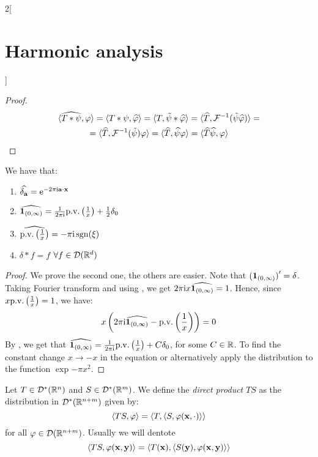 \documentclass[../../../main_math.tex]{subfiles}
\begin{document}
\begin{multicols}{2}[\section{Harmonic analysis}]
\begin{proof}
    \begin{multline*}
      \langle \widehat{T*\psi},\varphi\rangle=\langle T*\psi,\widehat{\varphi}\rangle=\langle T,\tilde\psi*\widehat{\varphi}\rangle=\langle \widehat{T},\mathcal{F}^{-1}(\tilde{\psi}\widehat{\varphi})\rangle=\\
      =\langle \widehat{T},\mathcal{F}^{-1}(\tilde{\psi})\varphi\rangle=\langle \widehat{T},\widehat{\psi}\varphi\rangle=\langle \widehat{T}\widehat{\psi},\varphi\rangle
    \end{multline*}
  \end{proof}
  \begin{lemma}\label{HA:lemma_propdelta}
    We have that:
    \begin{enumerate}
      \item $\widehat{\delta_{\boldsymbol{\mathrm{a}}}}=\mathrm{e}^{-2\pi\mathrm{i} \boldsymbol{\mathrm{a}}\cdot\boldsymbol{\mathrm{x}}}$
      \item $\widehat{\boldsymbol{\mathrm{1}}_{(0,\infty)}}=\frac{1}{2\pi\mathrm{i}}\mathrm{p.v.}\left(\frac{1}{x}\right)+\frac{1}{2}\delta_0$
      \item $\widehat{\mathrm{p.v.}\left(\frac{1}{x}\right)}=-\pi \mathrm{i} \operatorname{sgn}(\xi)$
      \item $\delta*f=f$ $\forall f\in \mathcal{D}(\mathbb{R}^d)$
    \end{enumerate}
  \end{lemma}
  \begin{proof}
    We prove the second one, the others are easier. Note that ${(\boldsymbol{\mathrm{1}}_{(0,\infty)})}'=\delta$. Taking Fourier transform and using , we get
    $ 2\pi\mathrm{i} x \widehat{\boldsymbol{\mathrm{1}}_{(0,\infty)}}=1$. Hence, since $x\mathrm{p.v.}\left(\frac{1}{x}\right)=1$, we have:
    $$
      x\left(2\pi\mathrm{i} \widehat{\boldsymbol{\mathrm{1}}_{(0,\infty)}}-\mathrm{p.v.}\left(\frac{1}{x}\right)\right)=0
    $$
    By , we get that $\widehat{\boldsymbol{\mathrm{1}}_{(0,\infty)}}=\frac{1}{2\pi\mathrm{i}}\mathrm{p.v.}\left(\frac{1}{x}\right)+C\delta_0$, for some $C\in \mathbb{R}$. To find the constant change $x\to -x$ in the equation or alternatively apply the distribution to the function $\exp{-\pi x^2}$.
  \end{proof}
  \begin{definition}
    Let $T\in \mathcal{D}^*(\mathbb{R}^n)$ and $S\in \mathcal{D}^*(\mathbb{R}^m)$. We define the \emph{direct product} $TS$ as the distribution in $\mathcal{D}^*(\mathbb{R}^{n+m})$ given by:
    $$
      \langle TS,\varphi\rangle=\langle T,\langle S ,\varphi(\boldsymbol{\mathrm{x}},\cdot)\rangle\rangle
    $$
    for all $\varphi\in \mathcal{D}(\mathbb{R}^{n+m})$. Usually we will dentote
    $$\langle TS,\varphi(\boldsymbol{\mathrm{x}},\boldsymbol{\mathrm{y}})\rangle=\langle T(\boldsymbol{\mathrm{x}}),\langle S(\boldsymbol{\mathrm{y}}) ,\varphi(\boldsymbol{\mathrm{x}},\boldsymbol{\mathrm{y}})\rangle\rangle$$

\end{definition}
\end{multicols}
\end{document}
